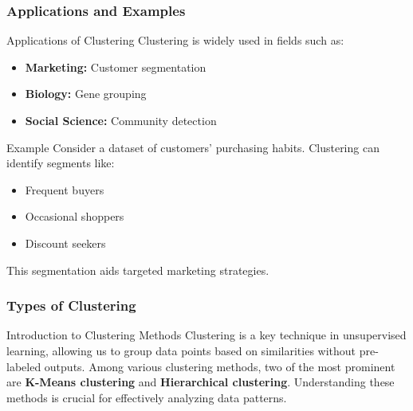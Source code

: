 \documentclass[aspectratio=169]{beamer}
\begin{document}
\begin{frame}[fragile]
    \frametitle{Applications and Examples}
    \begin{block}{Applications of Clustering}
        Clustering is widely used in fields such as:
        \begin{itemize}
            \item \textbf{Marketing:} Customer segmentation
            \item \textbf{Biology:} Gene grouping
            \item \textbf{Social Science:} Community detection
        \end{itemize}
    \end{block}

    \begin{block}{Example}
        Consider a dataset of customers' purchasing habits. Clustering can identify segments like:
        \begin{itemize}
            \item Frequent buyers
            \item Occasional shoppers
            \item Discount seekers
        \end{itemize}
        This segmentation aids targeted marketing strategies.
    \end{block}
\end{frame}

\begin{frame}[fragile]
    \frametitle{Types of Clustering}
    \begin{block}{Introduction to Clustering Methods}
        Clustering is a key technique in unsupervised learning, allowing us to group data points based on similarities without pre-labeled outputs.
        Among various clustering methods, two of the most prominent are \textbf{K-Means clustering} and \textbf{Hierarchical clustering}.
        Understanding these methods is crucial for effectively analyzing data patterns.
    \end{block}
\end{frame}
\end{document}
